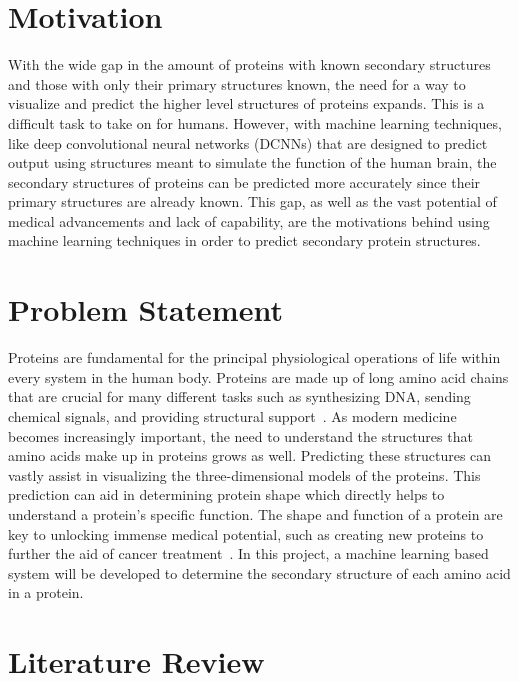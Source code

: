 \documentclass[12pt,letterpaper,oneside,reqno]{book}
\theoremstyle{plain}
\theoremstyle{definition}
\theoremstyle{plain}
\theoremstyle{remark}
\theoremstyle{plain}
\theoremstyle{definition}
\theoremstyle{plain}
\begin{document}
\section{Motivation}
With the wide gap in the amount of proteins with known secondary structures and those with only their primary structures known, the need for a way to visualize and predict the higher level structures of proteins expands. This is a difficult task to take on for humans. However, with machine learning techniques, like deep convolutional neural networks (DCNNs) that are designed to predict output using structures meant to simulate the function of the human brain, the secondary structures of proteins can be predicted more accurately since their primary structures are already known. This gap, as well as the vast potential of medical advancements and lack of capability, are the motivations behind using machine learning techniques in order to predict secondary protein structures.

\section{Problem Statement} 
Proteins are fundamental for the principal physiological operations of life within every system in the human body. Proteins are made up of long amino acid chains that are crucial for many different tasks such as synthesizing DNA, sending chemical signals, and providing structural support~\cite{lumenproteins}. As modern medicine becomes increasingly important, the need to understand the structures that amino acids make up in proteins grows as well. Predicting these structures can vastly assist in visualizing the three-dimensional models of the proteins. This prediction can aid in determining protein shape which directly helps to understand a protein's specific function. The shape and function of a protein are key to unlocking immense medical potential, such as creating new proteins to further the aid of cancer treatment~\cite{Malcolm19}. In this project, a machine learning based system will be developed to determine the secondary structure of each amino acid in a protein.


\section{Literature Review}
\end{document}
